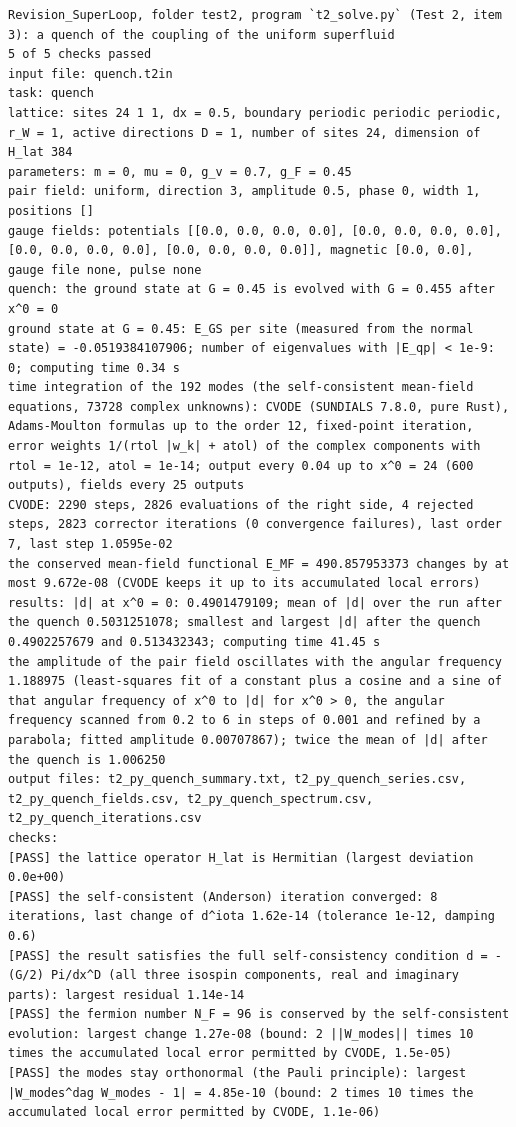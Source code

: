 \documentclass[
  10pt,
]{article}
\begin{document}
\begin{verbatim}
Revision_SuperLoop, folder test2, program `t2_solve.py` (Test 2, item 3): a quench of the coupling of the uniform superfluid
5 of 5 checks passed
input file: quench.t2in
task: quench
lattice: sites 24 1 1, dx = 0.5, boundary periodic periodic periodic, r_W = 1, active directions D = 1, number of sites 24, dimension of H_lat 384
parameters: m = 0, mu = 0, g_v = 0.7, g_F = 0.45
pair field: uniform, direction 3, amplitude 0.5, phase 0, width 1, positions []
gauge fields: potentials [[0.0, 0.0, 0.0, 0.0], [0.0, 0.0, 0.0, 0.0], [0.0, 0.0, 0.0, 0.0], [0.0, 0.0, 0.0, 0.0]], magnetic [0.0, 0.0], gauge file none, pulse none
quench: the ground state at G = 0.45 is evolved with G = 0.455 after x^0 = 0
ground state at G = 0.45: E_GS per site (measured from the normal state) = -0.0519384107906; number of eigenvalues with |E_qp| < 1e-9: 0; computing time 0.34 s
time integration of the 192 modes (the self-consistent mean-field equations, 73728 complex unknowns): CVODE (SUNDIALS 7.8.0, pure Rust), Adams-Moulton formulas up to the order 12, fixed-point iteration, error weights 1/(rtol |w_k| + atol) of the complex components with rtol = 1e-12, atol = 1e-14; output every 0.04 up to x^0 = 24 (600 outputs), fields every 25 outputs
CVODE: 2290 steps, 2826 evaluations of the right side, 4 rejected steps, 2823 corrector iterations (0 convergence failures), last order 7, last step 1.0595e-02
the conserved mean-field functional E_MF = 490.857953373 changes by at most 9.672e-08 (CVODE keeps it up to its accumulated local errors)
results: |d| at x^0 = 0: 0.4901479109; mean of |d| over the run after the quench 0.5031251078; smallest and largest |d| after the quench 0.4902257679 and 0.513432343; computing time 41.45 s
the amplitude of the pair field oscillates with the angular frequency 1.188975 (least-squares fit of a constant plus a cosine and a sine of that angular frequency of x^0 to |d| for x^0 > 0, the angular frequency scanned from 0.2 to 6 in steps of 0.001 and refined by a parabola; fitted amplitude 0.00707867); twice the mean of |d| after the quench is 1.006250
output files: t2_py_quench_summary.txt, t2_py_quench_series.csv, t2_py_quench_fields.csv, t2_py_quench_spectrum.csv, t2_py_quench_iterations.csv
checks:
[PASS] the lattice operator H_lat is Hermitian (largest deviation 0.0e+00)
[PASS] the self-consistent (Anderson) iteration converged: 8 iterations, last change of d^iota 1.62e-14 (tolerance 1e-12, damping 0.6)
[PASS] the result satisfies the full self-consistency condition d = -(G/2) Pi/dx^D (all three isospin components, real and imaginary parts): largest residual 1.14e-14
[PASS] the fermion number N_F = 96 is conserved by the self-consistent evolution: largest change 1.27e-08 (bound: 2 ||W_modes|| times 10 times the accumulated local error permitted by CVODE, 1.5e-05)
[PASS] the modes stay orthonormal (the Pauli principle): largest |W_modes^dag W_modes - 1| = 4.85e-10 (bound: 2 times 10 times the accumulated local error permitted by CVODE, 1.1e-06)
\end{verbatim}
\end{document}
